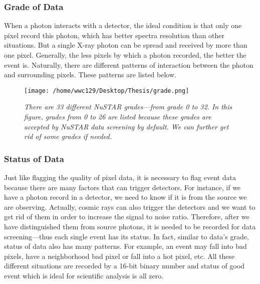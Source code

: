\documentclass[12pt]{report}
\begin{document}
        \subsubsection{Grade of Data}  
            When a photon interacts with a detector, the ideal condition is that only one pixel record this photon,
            which has better spectra resolution than other situations. 
            But a single X-ray photon can be spread and received by more than one pixel. Generally, the less pixels
            by which a photon recorded, the better the event is. 
            Naturally, there are different patterns of interaction between the
            photon and surrounding pixels. These patterns are listed below.  
            \begin{figure}[h] 
              \centering
              \texttt{[image: /home/wwc129/Desktop/Thesis/grade.png]}
              \begin{minipage}[c]{0.85\textwidth}
                \caption{\textit{\footnotesize There are 33 different \textit{NuSTAR} grades---from grade 0 to 32.
                          In this figure, grades from 0 to 26 are listed because these grades are accepted by 
                          \textit{NuSTAR} data screening by default. We can further get rid of some grades if needed.}}
              \end{minipage}
            \end{figure}
            


        \subsubsection{Status of Data} 
            Just like flagging the quality of pixel data, it is necessary to flag event data because there are many
            factors that can trigger detectors. For instance, if we have a photon record in a detector, we need to 
            know if it is from the source we are observing. Actually, cosmic rays can also trigger the 
            detectors and we want to get rid of them in order to increase the signal to noise ratio. 
            Therefore, after we have distinguished them from source photons, it is needed to be recorded for data
            screening---thus each single event has its status. In fact, similar to data's grade, status of data also
            has many patterns. For example, an event may fall into bad pixels, have a neighborhood bad pixel
            or fall into a hot pixel, etc. All these different situations are recorded by a 16-bit binary number and
            status of good event which is ideal for scientific analysis is all zero.\\
\end{document}
